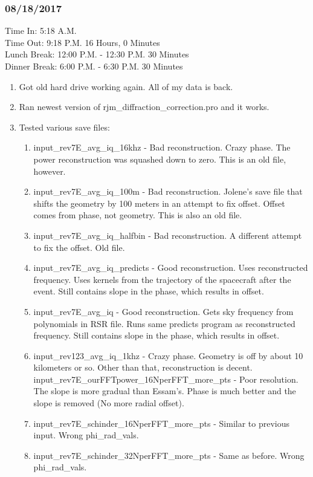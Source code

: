 \documentclass[crop=false,class=book]{standalone}
\begin{document}
\subsubsection{\footnotesize 08/18/2017}
Time In: 5:18 A.M.\\
Time Out: 9:18 P.M. \hfill 16 Hours, 0 Minutes\\
Lunch Break: 12:00 P.M. - 12:30 P.M. \hfill 30 Minutes\\
Dinner Break: 6:00 P.M. - 6:30 P.M. \hfill 30 Minutes
\begin{enumerate}
    \item Got old hard drive working again. All of my data is back.
    \item Ran newest version of rjm\_diffraction\_correction.pro and it works.
    \item Tested various save files:
    \begin{enumerate}
        \item input\_rev7E\_avg\_iq\_16khz - Bad reconstruction. Crazy phase. The power reconstruction was squashed down to zero. This is an old file, however.
        \item input\_rev7E\_avg\_iq\_100m - Bad reconstruction. Jolene's save file that shifts the geometry by 100 meters in an attempt to fix offset. Offset comes from phase, not geometry. This is also an old file.
        \item input\_rev7E\_avg\_iq\_halfbin - Bad reconstruction. A different attempt to fix the offset. Old file.
        \item input\_rev7E\_avg\_iq\_predicts - Good reconstruction. Uses reconstructed frequency. Uses kernels from the trajectory of the spacecraft after the event. Still contains slope in the phase, which results in offset.
        \item input\_rev7E\_avg\_iq - Good reconstruction. Gets sky frequency from polynomials in RSR file. Runs same predicts program as reconstructed frequency.  Still contains slope in the phase, which results in offset.
        \item input\_rev123\_avg\_iq\_1khz - Crazy phase. Geometry is off by about 10 kilometers or so. Other than that, reconstruction is decent.
        input\_rev7E\_ourFFTpower\_16NperFFT\_more\_pts - Poor resolution. The slope is more gradual than Essam's. Phase is much better and the slope is removed (No more radial offset). 
        \item input\_rev7E\_schinder\_16NperFFT\_more\_pts - Similar to previous input. Wrong phi\_rad\_vals. 
        \item input\_rev7E\_schinder\_32NperFFT\_more\_pts - Same as before. Wrong phi\_rad\_vals.

\end{enumerate}
\end{enumerate}
\end{document}
